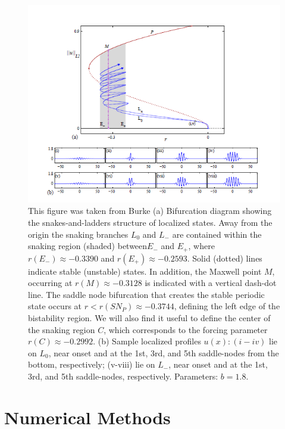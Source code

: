 \documentclass[pre,preprint,superscriptaddress]{revtex4-1}
\begin{document}
\begin{figure}[!htb]\center
\includegraphics[width=120mm]{BurkeSHE.PNG}
\caption{\label{fig:BurkeSHE}This figure was taken from Burke\cite{} (a) Bifurcation diagram showing the snakes-and-ladders structure of localized states. Away from the origin the snaking branches $L_0$ and $L_-$ are contained within the snaking region (shaded) between$E_-$ and $E_+$, where $r(E_-)\approx -0.3390$ and $r(E_+)\approx -0.2593$.   Solid (dotted) lines indicate stable (unstable) states. In addition, the Maxwell point $M$, occurring at $r(M)\approx -0.3128$  is indicated with a vertical dash-dot line.  The saddle node bifurcation that creates the stable periodic state occurs at $r<r(SN_P)\approx -0.3744$, defining the left edge of the bistability region.  We will also find it useful to define the center of the snaking region $C$, which corresponds to  the forcing parameter $r(C)\approx -0.2992$. (b) Sample localized profiles $u(x): (i-iv)$ lie on $L_0$, near onset and at the 1st, 3rd, and 5th saddle-nodes from the bottom, respectively; (v-viii) lie on $L_-$, near onset and at the 1st, 3rd, and 5th saddle-nodes, respectively. Parameters: $b = 1.8$.} 
\end{figure}



\section{Numerical Methods}
\end{document}
